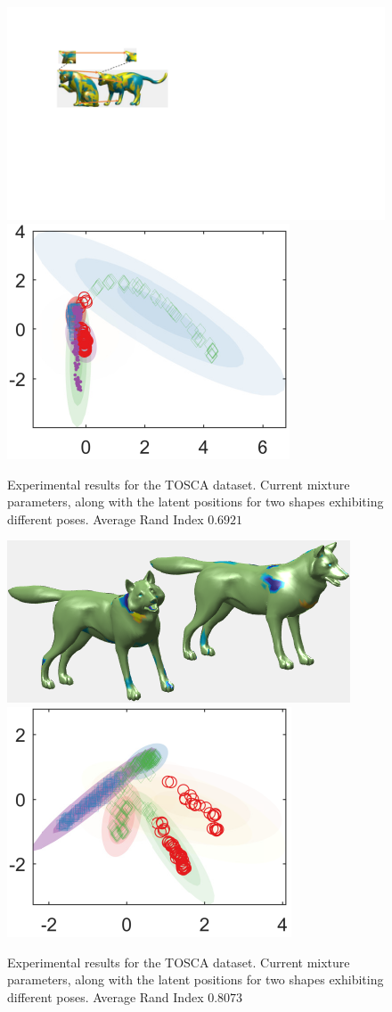 \documentclass[]{article}
\begin{document}
\begin{figure}[ht!]
	\centering
	
	\includegraphics[width=0.6\linewidth]{img/catMVMMexp1}
	\includegraphics[width=0.35\linewidth]{img/catMVMMexp3}
	\caption{Experimental results for the TOSCA dataset. Current mixture parameters, along with the latent positions for two shapes exhibiting different poses. Average Rand Index $0.6921$ }
\end{figure}

\begin{figure}[ht!]
	\centering
	
	\includegraphics[width=0.6\linewidth]{img/wolfMVMMexp1}
	\includegraphics[width=0.35\linewidth]{img/wolfMVMMexp3}
	\caption{Experimental results for the TOSCA dataset. Current mixture parameters, along with the latent positions for two shapes exhibiting different poses. Average Rand Index $0.8073$ }
\end{figure}
\end{document}
